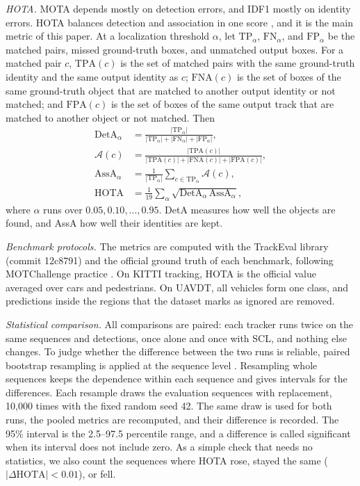 \documentclass[pdflatex,sn-mathphys-num,iicol]{sn-jnl}
\newcommand{\scl}{SCL}
\begin{document}
\emph{HOTA.} MOTA depends mostly on detection errors, and IDF1 mostly on identity errors. HOTA
balances detection and association in one score \cite{luiten2021hota}, and it is the main metric
of this paper. At a localization threshold $\alpha$, let $\mathrm{TP}_\alpha$, $\mathrm{FN}_\alpha$,
and $\mathrm{FP}_\alpha$ be the matched pairs, missed ground-truth boxes, and unmatched output boxes.
For a matched pair $c$, $\mathrm{TPA}(c)$ is the set of matched pairs with the same ground-truth
identity and the same output identity as $c$; $\mathrm{FNA}(c)$ is the set of boxes of the same
ground-truth object that are matched to another output identity or not matched; and
$\mathrm{FPA}(c)$ is the set of boxes of the same output track that are matched to another object
or not matched. Then
\begin{align}
\mathrm{DetA}_\alpha&=\frac{|\mathrm{TP}_\alpha|}{|\mathrm{TP}_\alpha|+|\mathrm{FN}_\alpha|+|\mathrm{FP}_\alpha|},\label{eq:deta}\\
\mathcal{A}(c)&=\frac{|\mathrm{TPA}(c)|}{|\mathrm{TPA}(c)|+|\mathrm{FNA}(c)|+|\mathrm{FPA}(c)|},\label{eq:ac}\\
\mathrm{AssA}_\alpha&=\frac{1}{|\mathrm{TP}_\alpha|}\sum_{c\in\mathrm{TP}_\alpha}\mathcal{A}(c),\label{eq:assa}\\
\mathrm{HOTA}&=\frac{1}{19}\sum_{\alpha}\sqrt{\mathrm{DetA}_\alpha\,\mathrm{AssA}_\alpha},\label{eq:hota}
\end{align}
where $\alpha$ runs over $0.05, 0.10, \dots, 0.95$. DetA measures how well the objects are found,
and AssA how well their identities are kept.

\emph{Benchmark protocols.} The metrics are computed with the TrackEval library (commit 12c8791)
and the official ground truth of each benchmark, following MOTChallenge practice
\cite{dendorfer2021motchallenge}. On KITTI tracking, HOTA is the official value averaged over cars
and pedestrians. On UAVDT, all vehicles form one class, and predictions inside the regions that the
dataset marks as ignored are removed.

\emph{Statistical comparison.} All comparisons are paired: each tracker runs twice on the same
sequences and detections, once alone and once with \scl{}, and nothing else changes. To judge
whether the difference between the two runs is reliable, paired bootstrap resampling is applied at
the sequence level \cite{efron1993bootstrap}. Resampling whole sequences keeps the dependence within
each sequence and gives intervals for the differences. Each resample draws the evaluation sequences
with replacement, 10,000 times with the fixed random seed 42. The same draw is used for both runs,
the pooled metrics are recomputed, and their difference is recorded. The 95\% interval is the
2.5--97.5 percentile range, and a difference is called significant when its interval does not
include zero. As a simple check that needs no statistics, we also count the sequences where HOTA
rose, stayed the same ($|\Delta\mathrm{HOTA}|<0.01$), or fell.
\end{document}
